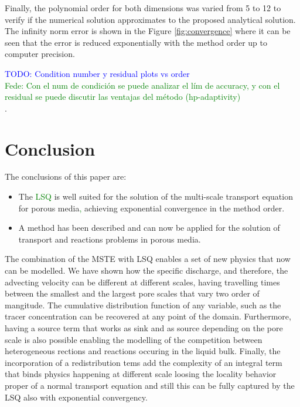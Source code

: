 \documentclass{CFD2011}
\newcommand{\TODO}[1]{\textcolor{blue}{TODO: #1} \\}
\newcommand{\Fede}[1]{\textcolor{green}{Fede: #1} \\}
\newcommand{\newf}[1]{\textcolor{green}{#1}}
\newcommand{\nof}[1]{\textcolor{cyan}{}}
\begin{document}



Finally, the polynomial order for both dimensions was varied from 5 to 12 to verify if the numerical solution approximates to the proposed analytical solution. The infinity norm error is shown in the Figure \ref{fig:convergence} where it can be seen that the error is reduced exponentially with the method order up to computer precision.

\TODO{Condition number y residual plots vs order}
\Fede{Con el num de condici\'on se puede analizar el l\'im de accuracy, y con el residual se puede discutir las ventajas del m\'etodo (hp-adaptivity)}.


\section{Conclusion}

The conclusions of this paper are:

\begin{itemize}
\item The \nof{least square high order method}\newf{LSQ} is well suited for the solution of the multi-scale transport equation for porous media\newf{,} achieving exponential convergence in the method order.
\item A method has been described and can now be applied for the solution of transport and reactions problems in porous media.
\end{itemize}

The combination of the MSTE with LSQ enables a set of new physics that now can be modelled. We have shown how the specific discharge, and therefore, the advecting velocity can be different at different scales, having travelling times between the smallest and the largest pore scales that vary two order of mangitude. The cumulative distribution function of any variable, such as the tracer concentration can be recovered at any point of the domain. Furthermore, having a source term that works as sink and as source depending on the pore scale is also possible enabling the modelling of the competition between heterogeneous rections and reactions occuring in the liquid bulk. Finally, the incorporation of a redistribution tems add the complexity of an integral term that binds physics happening at different scale loosing the locality behavior proper of a normal transport equation and still this can be fully captured by the LSQ also with exponential convergency.
\end{document}
